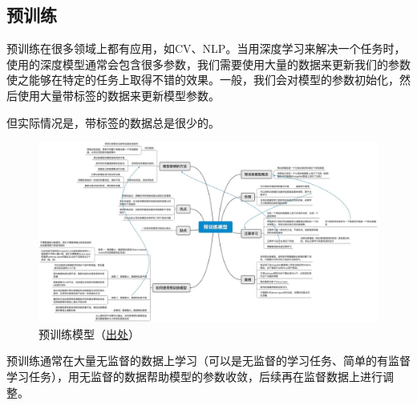 \subsection{预训练}
预训练在很多领域上都有应用，如CV、NLP。当用深度学习来解决一个任务时，使用的深度模型通常会包含很多参数，我们需要使用大量的数据来更新我们的参数使之能够在特定的任务上取得不错的效果。一般，我们会对模型的参数初始化，然后使用大量带标签的数据来更新模型参数。

但实际情况是，带标签的数据总是很少的。

\begin{figure}[h]
	\centering
	\includegraphics[width=\textwidth]{pics/pre-train.jpg}
	\caption{预训练模型（\href{https://www.zhihu.com/question/327642286/answer/1215812016}{出处}）}
	\label{fig:pre-train}
\end{figure}
预训练通常在大量无监督的数据上学习（可以是无监督的学习任务、简单的有监督学习任务），用无监督的数据帮助模型的参数收敛，后续再在监督数据上进行调整。




